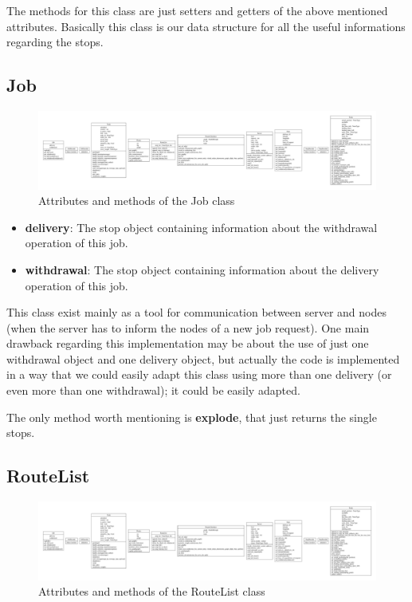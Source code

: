 \documentclass[titlepage]{article}
\begin{document}
The methods for this class are just setters and getters of the above mentioned attributes. Basically this class is our data structure for all the useful informations regarding the  stops.

\subsection{Job}
\begin{figure}[H]
    \centering
    \includegraphics[trim={0 8cm 91cm 8cm}, clip, scale=.5]{img/classes.pdf}
    \caption{Attributes and methods of the Job class}
    \label{fig:job_class}
\end{figure}

\begin{itemize}
    \item \textbf{delivery}: The stop object containing information about the withdrawal operation of this job.
    \item \textbf{withdrawal}: The stop object containing information about the delivery operation of this job.
\end{itemize}

This class exist mainly as a tool for communication between server and nodes (when the server has to inform the nodes of a new job request). One main drawback regarding this implementation may be about the use of just one withdrawal object and one delivery object, but actually the code is implemented in a way that we could easily adapt this class using more than one delivery (or even more than one withdrawal); it could be easily adapted.

The only method worth mentioning is \textbf{explode}, that just returns the single stops.

\subsection{RouteList}
\begin{figure}[H]
    \centering
    \includegraphics[trim={33cm 8cm 58cm 8cm}, clip, scale=.5]{img/classes.pdf}
    \caption{Attributes and methods of the RouteList class}
    \label{fig:routelist_class}
\end{figure}
\end{document}

